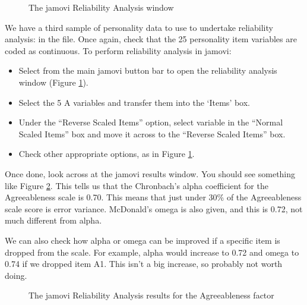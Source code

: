 
\begin{figure}[!htp]
\begin{center}
\caption{The jamovi Reliability Analysis window}
\label{fig:rel1}
\HR
\end{center}
\end{figure}

We have a third sample of personality data to use to undertake reliability analysis: in the  file. Once again, check that the 25 personality item variables are coded as continuous. To perform reliability analysis in jamovi:

\begin{itemize} \itemsep -2pt
\item Select  from the main jamovi button bar to open the reliability analysis window (Figure \ref{fig:rel1}).
\item Select the 5 A variables and transfer them into the ‘Items’ box.
\item Under the “Reverse Scaled Items” option, select variable  in the “Normal Scaled Items” box and move it across to the “Reverse Scaled Items” box. 
\item Check other appropriate options, as in Figure \ref{fig:rel1}.
\end{itemize}


Once done, look across at the jamovi results window. You should see something like Figure \ref{fig:rel2}. This tells us that the Chronbach’s alpha coefficient for the Agreeableness scale is 0.70. This means that just under 30\% of the Agreeableness scale score is error variance. McDonald’s omega is also given, and this is 0.72, not much different from alpha.

We can also check how alpha or omega can be improved if a specific item is dropped from the scale. For example, alpha would increase to 0.72 and omega to 0.74 if we dropped item A1. This isn’t a big increase, so probably not worth doing. 

\begin{figure}[!htp]
\begin{center}
\caption{The jamovi Reliability Analysis results for the Agreeableness factor}
\label{fig:rel2}
\HR
\end{center}
\end{figure}

